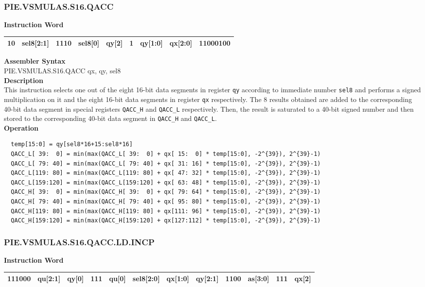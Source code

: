 \newpage
\subsubsection{PIE.VSMULAS.S16.QACC}\label{instruction:PIEVSMULASS16QACC}
\setlength\tabcolsep{6pt}
\textbf{Instruction Word} \\
\begin{tabular}{|c|c|c|c|c|c|c|c|c|}
	\hline
	10 & sel8[2:1] & 1110 & sel8[0] & qy[2] & 1 & qy[1:0] & qx[2:0] & 11000100 \\
	\hline
\end{tabular}

\textbf{Assembler Syntax} \\
PIE.VSMULAS.S16.QACC qx, qy, sel8 \\
\textbf{Description} \\
This instruction selects one out of the eight 16-bit data segments in register \lstinline{qy} according to immediate number \lstinline{sel8} and performs a signed multiplication on it and the eight 16-bit data segments in register \lstinline{qx} respectively. The 8 results obtained are added to the corresponding 40-bit data segment in special registers \lstinline{QACC_H} and \lstinline{QACC_L} respectively. Then, the result is saturated to a 40-bit signed number and then stored to the corresponding 40-bit data segment in \lstinline{QACC_H} and \lstinline{QACC_L}.\\
\textbf{Operation}
\begin{lstlisting}
  temp[15:0] = qy[sel8*16+15:sel8*16]
  QACC_L[ 39:  0] = min(max(QACC_L[ 39:  0] + qx[ 15:  0] * temp[15:0], -2^{39}), 2^{39}-1)
  QACC_L[ 79: 40] = min(max(QACC_L[ 79: 40] + qx[ 31: 16] * temp[15:0], -2^{39}), 2^{39}-1)
  QACC_L[119: 80] = min(max(QACC_L[119: 80] + qx[ 47: 32] * temp[15:0], -2^{39}), 2^{39}-1)
  QACC_L[159:120] = min(max(QACC_L[159:120] + qx[ 63: 48] * temp[15:0], -2^{39}), 2^{39}-1)
  QACC_H[ 39:  0] = min(max(QACC_H[ 39:  0] + qx[ 79: 64] * temp[15:0], -2^{39}), 2^{39}-1)
  QACC_H[ 79: 40] = min(max(QACC_H[ 79: 40] + qx[ 95: 80] * temp[15:0], -2^{39}), 2^{39}-1)
  QACC_H[119: 80] = min(max(QACC_H[119: 80] + qx[111: 96] * temp[15:0], -2^{39}), 2^{39}-1)
  QACC_H[159:120] = min(max(QACC_H[159:120] + qx[127:112] * temp[15:0], -2^{39}), 2^{39}-1)
\end{lstlisting}

\newpage
\subsubsection{PIE.VSMULAS.S16.QACC.LD.INCP}\label{instruction:PIEVSMULASS16QACCLDINCP}
\setlength\tabcolsep{6pt}
\textbf{Instruction Word} \\
\begin{tabular}{|c|c|c|c|c|c|c|c|c|c|c|c|}
	\hline
	111000 & qu[2:1] & qy[0] & 111 & qu[0] & sel8[2:0] & qx[1:0] & qy[2:1] & 1100 & as[3:0] & 111 & qx[2] \\
	\hline
\end{tabular}

